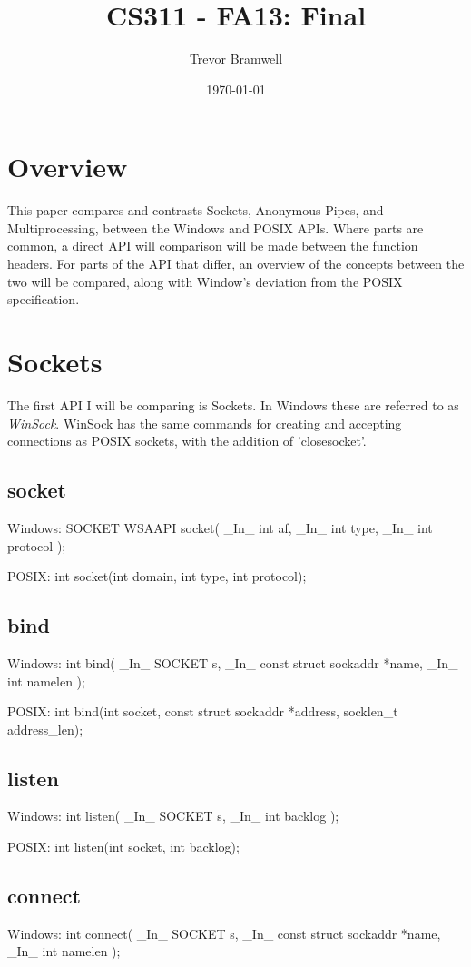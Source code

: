 \documentclass[letterpaper,10pt]{article}
\title{CS311 - FA13: Final}
\date{\today}
\author{Trevor Bramwell}
\begin{document}
\maketitle

\section{Overview}

This paper compares and contrasts Sockets, Anonymous Pipes, and
Multiprocessing, between the Windows and POSIX APIs. Where
parts are common, a direct API will comparison will be made between the
function headers. For parts of the API that differ, an overview of the
concepts between the two will be compared, along with Window's
deviation from the POSIX specification.

\section{Sockets}

The first API I will be comparing is Sockets. In Windows these are
referred to as \emph{WinSock}. WinSock has the same commands for
creating and accepting connections as POSIX sockets, with the addition
of 'closesocket'.

\subsection{socket}
Windows:
SOCKET WSAAPI socket(
  \_In\_  int af,
  \_In\_  int type,
  \_In\_  int protocol
);

POSIX:
int socket(int domain, int type, int protocol);

\subsection{bind}
Windows:
int bind(
  \_In\_  SOCKET s,
  \_In\_  const struct sockaddr *name,
  \_In\_  int namelen
);

POSIX:
int bind(int socket, const struct sockaddr *address,
       socklen\_t address\_len);

\subsection{listen}
Windows:
int listen(
  \_In\_  SOCKET s,
  \_In\_  int backlog
);

POSIX:
int listen(int socket, int backlog);

\subsection{connect}
Windows:
int connect(
  \_In\_  SOCKET s,
  \_In\_  const struct sockaddr *name,
  \_In\_  int namelen
);
\end{document}
